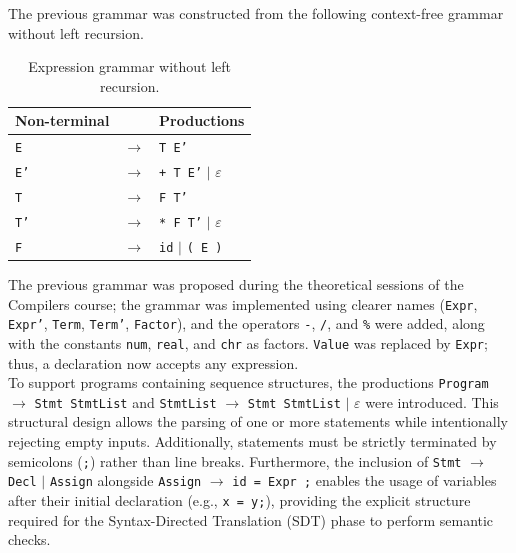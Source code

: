 \documentclass[12pt,letterpaper]{article}
\newcommand{\cod}[1]{\texttt{#1}} %
\newcommand{\anchotabla}{0.9\textwidth} %
\begin{document}
The previous grammar was constructed from the following context-free grammar without left recursion.
\newpage

\begin{table}[H]
\centering
\renewcommand{\arraystretch}{1.2}
\begin{tabular}{@{}p{0.20\dimexpr\anchotabla} p{0.08\dimexpr\anchotabla} p{0.68\dimexpr\anchotabla}@{}}
\toprule
\textbf{Non-terminal} & & \textbf{Productions} \\
\midrule
\cod{E}  & $\rightarrow$ & \cod{T E'} \\
\cod{E'} & $\rightarrow$ & \cod{+ T E'} $\mid$ $\varepsilon$ \\
\cod{T}  & $\rightarrow$ & \cod{F T'} \\
\cod{T'} & $\rightarrow$ & \cod{* F T'} $\mid$ $\varepsilon$ \\
\cod{F}  & $\rightarrow$ & \cod{id} $\mid$ \cod{( E )} \\
\bottomrule
\end{tabular}
\caption{Expression grammar without left recursion.}
\end{table}

The previous grammar was proposed during the theoretical sessions of the Compilers course; the grammar was implemented using clearer names (\texttt{Expr}, \texttt{Expr'}, \texttt{Term}, \texttt{Term'}, \texttt{Factor}), and the operators \texttt{-}, \texttt{/}, and \texttt{\%} were added, along with the constants \texttt{num}, \texttt{real}, and \texttt{chr} as factors. \texttt{Value} was replaced by \texttt{Expr}; thus, a declaration now accepts any expression.\\

To support programs containing sequence structures, the productions \texttt{Program} $\rightarrow$ \texttt{Stmt StmtList} and \texttt{StmtList} $\rightarrow$ \texttt{Stmt StmtList} $\mid$ $\varepsilon$ were introduced. This structural design allows the parsing of one or more statements while intentionally rejecting empty inputs. Additionally, statements must be strictly terminated by semicolons (\texttt{;}) rather than line breaks. Furthermore, the inclusion of \texttt{Stmt} $\rightarrow$ \texttt{Decl} $\mid$ \texttt{Assign} alongside \texttt{Assign} $\rightarrow$ \texttt{id = Expr ;} enables the usage of variables after their initial declaration (e.g., \texttt{x = y;}), providing the explicit structure required for the Syntax-Directed Translation (SDT) phase to perform semantic checks.\\
\end{document}
